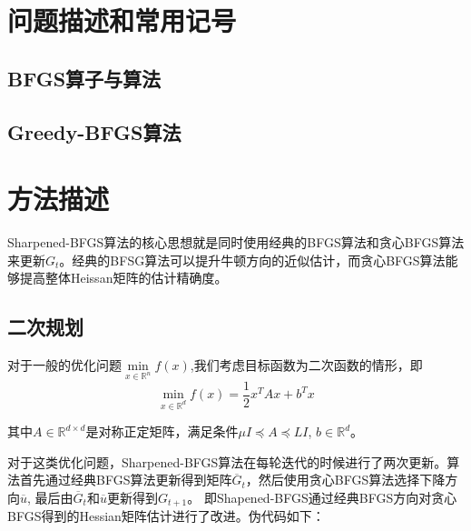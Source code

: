 \documentclass[a4paper,twoside,AutoFakeBold]{article}
\theoremstyle{definition}
\begin{document}
%
\section{问题描述和常用记号}\label{section:preliminary}

\subsection{BFGS算子与算法}

\subsection{Greedy-BFGS算法}

%
\section{方法描述}\label{section:methods}

Sharpened-BFGS算法的核心思想就是同时使用经典的BFGS算法和贪心BFGS算法来更新$G_t$。经典的BFSG算法可以提升牛顿方向的近似估计，而贪心BFGS算法能够提高整体Heissan矩阵的估计精确度。

\subsection{二次规划}

对于一般的优化问题$\mathop{\min}\limits_{x\in\mathbb{R}^n}f(x)$,我们考虑目标函数为二次函数的情形，即
\begin{equation}
    \mathop{\min}\limits_{x\in\mathbb{R}^d}f(x)=\frac{1}{2}x^TAx+b^Tx
\end{equation}

其中$A\in\mathbb{R}^{d\times d}$是对称正定矩阵，满足条件$\mu I\preceq A\preceq LI$, $b\in\mathbb{R}^d$。

对于这类优化问题，Sharpened-BFGS算法在每轮迭代的时候进行了两次更新。算法首先通过经典BFGS算法更新得到矩阵$\overline{G}_t$，然后使用贪心BFGS算法选择下降方向$\overline{u}$, 最后由$\overline{G}_t$和$\overline{u}$更新得到$G_{t+1}$。
即Shapened-BFGS通过经典BFGS方向对贪心BFGS得到的Hessian矩阵估计进行了改进。伪代码如下：
\end{document}
